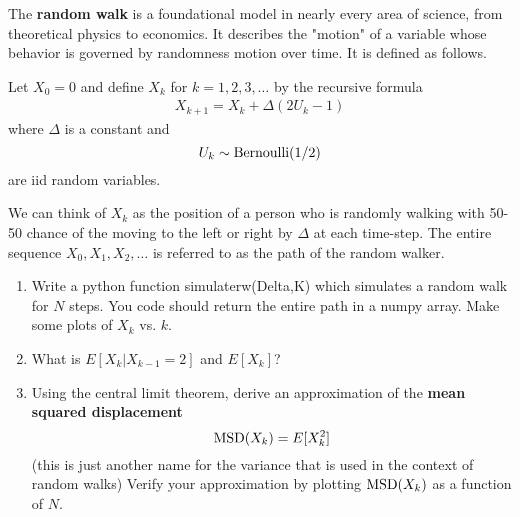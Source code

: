 \begin{exercise}
The {\bf random walk} is a foundational model in nearly every area of science, from theoretical physics to economics. It describes the "motion" of a variable whose behavior is governed by randomness motion over time. It is defined as follows. 

Let $X_0=0$ and define $X_k$ for $k=1,2,3,\dots$ by the recursive formula 
\begin{align}\label{eq:rw}
X_{k+1} = X_{k}  + \Delta(2U_k - 1)
\end{align}
where $\Delta$ is a constant and 
\begin{equation*}
U_k  \sim {\rm Bernoulli}(1/2)
\end{equation*}
are iid random variables. 


We can think of $X_k$ as the position of a person who is randomly walking with 50-50 chance of the moving to the left or right by $\Delta$ at each time-step. The entire sequence $X_0,X_1,X_2,\dots$ is referred to as the path of the random walker. 
\begin{enumerate}[label=(\alph*)]
\item Write a python function simulaterw(Delta,K) which simulates a random walk for $N$ steps. You code should return the entire path in a numpy array. Make some plots of $X_k$ vs. $k$. 
\item What is $E[X_k|X_{k-1}=2]$ and $E[X_k]$? 
\item Using the central limit theorem, derive an approximation of the {\bf mean squared displacement}
\begin{equation*}
{\rm MSD}(X_k) = E[X_k^2]
\end{equation*}
(this is just another name for the variance that is used in the context of random walks)
Verify your approximation by plotting ${\rm MSD}(X_k)$ as a function of $N$. 
\end{enumerate}


\end{exercise}




